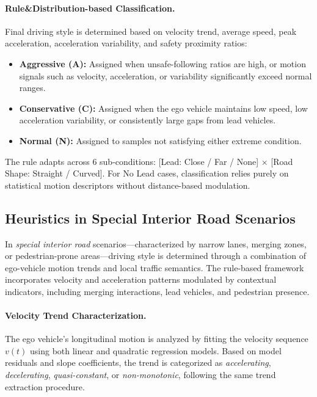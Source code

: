 \documentclass{article}
\begin{document}
\paragraph{Rule\&Distribution-based Classification.}
Final driving style is determined based on velocity trend, average speed, peak acceleration, acceleration variability, and safety proximity ratios:
\begin{itemize}[leftmargin=1em, topsep=0pt, itemsep=0.3em]
    \item \textbf{Aggressive (A):} Assigned when unsafe-following ratios are high, or motion signals such as velocity, acceleration, or variability significantly exceed normal ranges.
    \item \textbf{Conservative (C):} Assigned when the ego vehicle maintains low speed, low acceleration variability, or consistently large gaps from lead vehicles.
    \item \textbf{Normal (N):} Assigned to samples not satisfying either extreme condition.
\end{itemize}

The rule adapts across 6 sub-conditions: [Lead: Close / Far / None] $\times$ [Road Shape: Straight / Curved]. For No Lead cases, classification relies purely on statistical motion descriptors without distance-based modulation.

\subsection{Heuristics in Special Interior Road Scenarios}

In \textit{special interior road} scenarios—characterized by narrow lanes, merging zones, or pedestrian-prone areas—driving style is determined through a combination of ego-vehicle motion trends and local traffic semantics. The rule-based framework incorporates velocity and acceleration patterns modulated by contextual indicators, including merging interactions, lead vehicles, and pedestrian presence.

\paragraph{Velocity Trend Characterization.}
The ego vehicle's longitudinal motion is analyzed by fitting the velocity sequence $v(t)$ using both linear and quadratic regression models. Based on model residuals and slope coefficients, the trend is categorized as \textit{accelerating}, \textit{decelerating}, \textit{quasi-constant}, or \textit{non-monotonic}, following the same trend extraction procedure.
\end{document}
